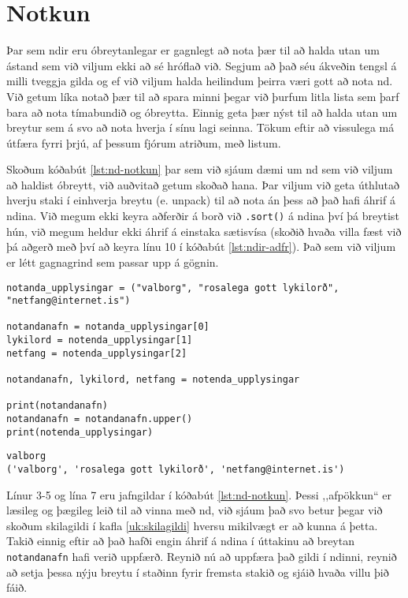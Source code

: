 \section{Notkun}
Þar sem ndir eru óbreytanlegar er gagnlegt að nota þær til að halda utan um ástand sem við viljum ekki að sé hróflað við.
Segjum að það séu ákveðin tengsl á milli tveggja gilda og ef við viljum halda heilindum þeirra væri gott að nota nd.
Við getum líka notað þær til að spara minni þegar við þurfum litla lista sem þarf bara að nota tímabundið og óbreytta.
Einnig geta þær nýst til að halda utan um breytur sem á svo að nota hverja í sínu lagi seinna.
Tökum eftir að vissulega má útfæra fyrri þrjú, af þessum fjórum atriðum, með listum.

Skoðum kóðabút \ref{lst:nd-notkun} þar sem við sjáum dæmi um nd sem við viljum að haldist óbreytt, við auðvitað getum skoðað hana.
Þar viljum við geta úthlutað hverju staki í einhverja breytu (e. unpack) til að nota án þess að það hafi áhrif á ndina.
Við megum ekki keyra aðferðir á borð við \texttt{.sort()} á ndina því þá breytist hún, við megum heldur ekki áhrif á einstaka sætisvísa (skoðið hvaða villa fæst við þá aðgerð með því að keyra línu 10 í kóðabút \ref{lst:ndir-adfr}).
Það sem við viljum er létt gagnagrind sem passar upp á gögnin.




\begin{lstlisting}[caption=Ndir notaðar fyrir það sem þær eru gagnlegar, label=lst:nd-notkun]
notanda_upplysingar = ("valborg", "rosalega gott lykilorð", "netfang@internet.is")

notandanafn = notanda_upplysingar[0]
lykilord = notenda_upplysingar[1]
netfang = notenda_upplysingar[2]

notandanafn, lykilord, netfang = notenda_upplysingar

print(notandanafn)
notandanafn = notandanafn.upper()
print(notenda_upplysingar)
\end{lstlisting}
\lstset{style=uttak}
\begin{lstlisting}
valborg
('valborg', 'rosalega gott lykilorð', 'netfang@internet.is')
\end{lstlisting}
\lstset{style=venjulegt}

Línur 3-5 og lína 7 eru jafngildar í kóðabút \ref{lst:nd-notkun}.
Þessi ,,afpökkun“ er læsileg og þægileg leið til að vinna með nd, við sjáum það svo betur þegar við skoðum skilagildi í kafla \ref{uk:skilagildi} hversu mikilvægt er að kunna á þetta.
Takið einnig eftir að það hafði engin áhrif á ndina í úttakinu að breytan \texttt{notandanafn} hafi verið uppfærð.
Reynið nú að uppfæra það gildi í ndinni, reynið að setja þessa nýju breytu í staðinn fyrir fremsta stakið  og sjáið hvaða villu þið fáið.

